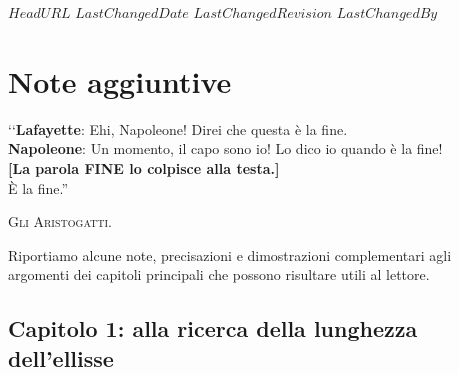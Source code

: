 \svnidlong
{$HeadURL$}
{$LastChangedDate$}
{$LastChangedRevision$}
{$LastChangedBy$}

\chapter{Note aggiuntive}
\begin{introduction}
‘‘\textbf{Lafayette}: Ehi, Napoleone! Direi che questa è la fine.\\
\textbf{Napoleone}: Un momento, il capo sono io! Lo dico io quando è la fine!\\
\textbf{[La parola \textsf{FINE} lo colpisce alla testa.]}\\
È la fine.''
\begin{flushright}
	\textsc{Gli Aristogatti.}
\end{flushright}
\end{introduction}

\noindent Riportiamo alcune note, precisazioni e dimostrazioni complementari agli argomenti dei capitoli principali che possono risultare utili al lettore.
\section{Capitolo 1: alla ricerca della lunghezza dell'ellisse}
